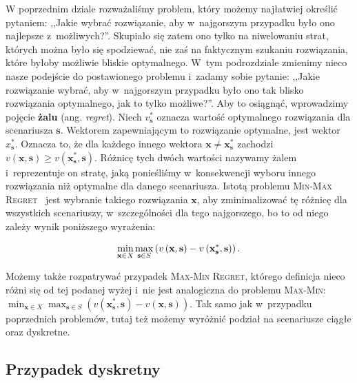 W poprzednim dziale rozważaliśmy problem, który możemy najłatwiej określić pytaniem: ,,Jakie wybrać rozwiązanie, aby w~najgorszym przypadku było ono najlepsze z~możliwych?''.
Skupiało się zatem ono tylko na niwelowaniu strat, których można było się spodziewać, nie zaś na faktycznym szukaniu rozwiązania, które byłoby możliwie bliskie optymalnego.
W~tym podrozdziale zmienimy nieco nasze podejście do postawionego problemu i~zadamy sobie pytanie: ,,Jakie rozwiązanie wybrać, aby w~najgorszym przypadku było ono tak blisko rozwiązania optymalnego, jak to tylko możliwe?''.
Aby to osiągnąć, wprowadzimy pojęcie \textbf{żalu} (ang. \textit{regret}).
Niech $v_{\textbf{s}}^{\ast}$ oznacza wartość optymalnego rozwiązania dla scenariusza $\textbf{s}$.
Wektorem zapewniającym to rozwiązanie optymalne, jest wektor $x^{\ast}_{\textbf{s}}$.
Oznacza to, że dla każdego innego wektora $\textbf{x} \neq \textbf{x}^{\ast}_{\textbf{s}}$ zachodzi $v \left( \textbf{x}, \textbf{s} \right) \geqslant v \left( \textbf{x}^{\ast}_{\textbf{s}}, \textbf{s} \right)$.
Różnicę tych dwóch wartości nazywamy żalem i~reprezentuje on stratę, jaką ponieśliśmy w~konsekwencji wyboru innego rozwiązania niż optymalne dla danego scenariusza.
Istotą problemu \textsc{Min-Max Regret}~\cite[$595$]{Kasperski2012} jest wybranie takiego rozwiązania $\textbf{x}$, aby zminimalizować tę różnicę dla wszystkich scenariuszy, w~szczególności dla tego najgorszego, bo to od niego zależy wynik poniższego wyrażenia:

\begin{equation}
	\min_{\mathclap{\textbf{x} \in X}} \max_{\mathclap{\textbf{s} \in S}} \left( v \left( \textbf{x}, \textbf{s} \right) - v \left( \textbf{x}^{\ast}_{\textbf{s}}, \textbf{s} \right) \right)\text{.}
\end{equation}

Możemy także rozpatrywać przypadek \textsc{Max-Min Regret}, którego definicja nieco różni się od tej podanej wyżej i~nie jest analogiczna do problemu \textsc{Max-Min}: $\min_{\textbf{x} \in X} \max_{\textbf{s} \in S} \left( v \left( \textbf{x}^{\ast}_{\textbf{s}}, \textbf{s} \right) - v \left( \textbf{x}, \textbf{s} \right) \right)$.
Tak samo jak w~przypadku poprzednich problemów, tutaj też możemy wyróżnić podział na scenariusze ciągłe oraz dyskretne.



\subsection{Przypadek dyskretny}



